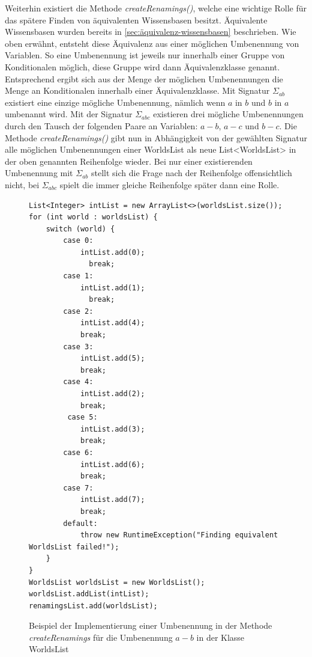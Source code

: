 \documentclass[12pt,a4paper]{article}
\begin{document}
Weiterhin existiert die Methode \textit{createRenamings()}, welche eine wichtige Rolle für das spätere Finden von äquivalenten Wissensbasen besitzt. Äquivalente Wissensbasen wurden bereits in  \autoref{sec:äquivalenz-wissensbasen} beschrieben. Wie oben erwähnt, entsteht diese Äquivalenz aus einer möglichen Umbenennung von Variablen. So eine Umbenennung ist jeweils nur innerhalb einer Gruppe von Konditionalen möglich, diese Gruppe wird dann Äquivalenzklasse genannt. Entsprechend ergibt sich aus der Menge der möglichen Umbenennungen die Menge an Konditionalen innerhalb einer Äquivalenzklasse. Mit Signatur $\Sigma_{ab}$ existiert eine einzige mögliche Umbenennung, nämlich wenn $a$ in $b$ und $b$ in $a$ umbenannt wird. Mit der Signatur $\Sigma_{abc}$ existieren drei mögliche Umbenennungen durch den Tausch der folgenden Paare an Variablen: $a-b$, $a-c$ und $b-c$. Die Methode \textit{createRenamings()} gibt nun in Abhängigkeit von der gewählten Signatur alle möglichen Umbenennungen einer WorldsList als neue List<WorldsList> in der oben genannten Reihenfolge wieder. Bei nur einer existierenden Umbenennung mit $\Sigma_{ab}$ stellt sich die Frage nach der Reihenfolge offensichtlich nicht, bei $\Sigma_{abc}$ spielt die immer gleiche Reihenfolge später dann eine Rolle.


\begin{figure}
\begin{lstlisting}
List<Integer> intList = new ArrayList<>(worldsList.size());
for (int world : worldsList) {
    switch (world) {
        case 0:
            intList.add(0);
              break;
        case 1:
            intList.add(1);
              break;
        case 2:
            intList.add(4);
            break;
        case 3:
            intList.add(5);
            break;
        case 4:
            intList.add(2);
            break;
         case 5:
            intList.add(3);
            break;
        case 6:
            intList.add(6);
            break;
        case 7:
            intList.add(7);
            break;
        default:
            throw new RuntimeException("Finding equivalent WorldsList failed!");
    }
}
WorldsList worldsList = new WorldsList();
worldsList.addList(intList);
renamingsList.add(worldsList);
\end{lstlisting}
\caption{Beispiel der Implementierung einer Umbenennung in der Methode \textit{createRenamings} für die Umbenennung $a-b$ in der Klasse WorldsList}
\label{code:renaming}
\end{figure}
\end{document}
